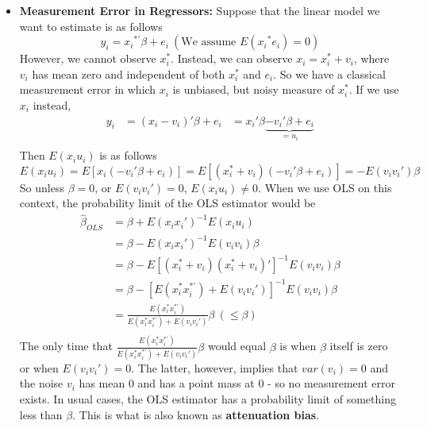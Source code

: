 \documentclass[12pt]{article}
\theoremstyle{definition}
\theoremstyle{property}
\theoremstyle{assumption}
\theoremstyle{example}
\theoremstyle{comment}
\newtheorem{comment}{Comment}[section]
\begin{document}
\begin{itemize}
\item \textbf{Measurement Error in Regressors: }  Suppose that the linear model we want to estimate is as follows
\[
y_i = {x_i}^{*'}\beta+e_i \ (\text{We assume }E({x_i}^{*}e_i)=0)
\]
However, we cannot observe $x_i^*$. Instead, we can observe $x_i=x_i^*+v_i$, where $v_i$ has mean zero and independent of both $x_i^*$ and $e_i$. So we have a classical measurement error in which $x_i$ is unbiased, but noisy measure of $x_i^*$. If we use $x_i$ instead, 
\[
\begin{aligned}
y_i &= (x_i-v_i)'\beta+e_i &=x_i'\beta \underbrace{-v_i'\beta+e_i}_{=u_i} \\
\end{aligned}
\]
Then $E(x_iu_i)$ is as follows
\[
E(x_iu_i)=E[x_i(-v_i'\beta+e_i)]=E[(x_i^{*}+v_i)(-v_i'\beta+e_i)]=-E(v_iv_i')\beta
\]
So unless $\beta=0$, or $E(v_iv_i')=0$, $E(x_iu_i)\neq0$.  When we use OLS on this context, the probability limit of the OLS estimator would be
\[
\begin{aligned}
\hat{\beta}_{OLS} &=\beta+E(x_ix_i')^{-1}E(x_iu_i)\\
&=\beta-E(x_ix_i')^{-1}E(v_iv_i)\beta\\
&=\beta-E[(x_i^*+v_i)(x_i^*+v_i)']^{-1}E(v_iv_i)\beta\\
&=\beta-[E(x_i^*x_i^{*'})+E(v_iv_i')]^{-1}E(v_iv_i)\beta\\
&=\frac{E(x_i^*x_i^{*'})}{E(x_i^*x_i^{*'})+E(v_iv_i')}\beta \ (\leq\beta)\\
\end{aligned}
\]
The only time that $\frac{E(x_i^*x_i^{*'})}{E(x_i^*x_i^{*'})+E(v_iv_i')}\beta$ would equal $\beta$ is when $\beta$ itself is zero or when $E(v_iv_i')=0$. The latter, however, implies that $var(v_i)=0$ and the noise $v_i$ has mean 0 and has a point mass at 0 - so no measurement error exists. In usual cases, the OLS estimator has a probability limit of something less than $\beta$.  This is what is also known as \textbf{attenuation bias}. 
\begin{mdframed}[backgroundcolor=yellow!5] 
\begin{comment}[Comment on Measurement Errors]
So how do we address the endogeneity problem?
\begin{itemize}
\item If there exists another noisy, but unbiased measure of $x_i^*$, namely $w_i=x_i^*+\delta_i$, we can use $w_i$ to instrument for $x_i$. The condition is that $\eta_i$ has mean zero and uncorrelated with $(x_i^*, e_i. v_i)$. Try verifying that this satisfies all IV conditions. 

\end{comment}
\end{mdframed}
\end{itemize}
\end{document}
